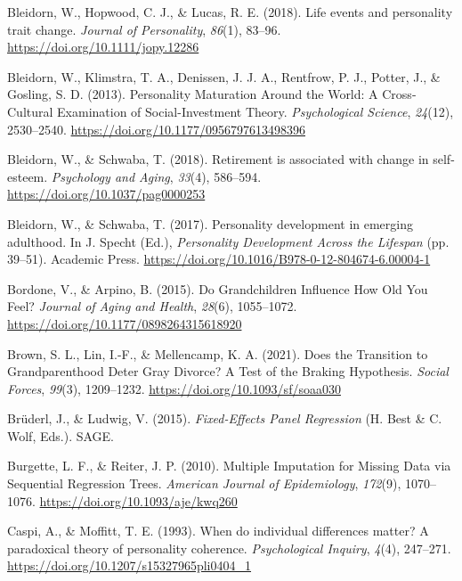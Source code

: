 \documentclass[
  english,
  man, noextraspace]{apa7}
\begin{document}
\leavevmode\hypertarget{ref-bleidornLifeEventsPersonality2018}{}%
Bleidorn, W., Hopwood, C. J., \& Lucas, R. E. (2018). Life events and personality trait change. \emph{Journal of Personality}, \emph{86}(1), 83--96. \url{https://doi.org/10.1111/jopy.12286}

\leavevmode\hypertarget{ref-bleidornPersonalityMaturationWorld2013}{}%
Bleidorn, W., Klimstra, T. A., Denissen, J. J. A., Rentfrow, P. J., Potter, J., \& Gosling, S. D. (2013). Personality Maturation Around the World: A Cross-Cultural Examination of Social-Investment Theory. \emph{Psychological Science}, \emph{24}(12), 2530--2540. \url{https://doi.org/10.1177/0956797613498396}

\leavevmode\hypertarget{ref-bleidornRetirementAssociatedChange2018}{}%
Bleidorn, W., \& Schwaba, T. (2018). Retirement is associated with change in self-esteem. \emph{Psychology and Aging}, \emph{33}(4), 586--594. \url{https://doi.org/10.1037/pag0000253}

\leavevmode\hypertarget{ref-bleidornPersonalityDevelopmentEmerging2017}{}%
Bleidorn, W., \& Schwaba, T. (2017). Personality development in emerging adulthood. In J. Specht (Ed.), \emph{Personality Development Across the Lifespan} (pp. 39--51). Academic Press. \url{https://doi.org/10.1016/B978-0-12-804674-6.00004-1}

\leavevmode\hypertarget{ref-bordoneGrandchildrenInfluenceHow2015}{}%
Bordone, V., \& Arpino, B. (2015). Do Grandchildren Influence How Old You Feel? \emph{Journal of Aging and Health}, \emph{28}(6), 1055--1072. \url{https://doi.org/10.1177/0898264315618920}

\leavevmode\hypertarget{ref-brownDoesTransitionGrandparenthood2021}{}%
Brown, S. L., Lin, I.-F., \& Mellencamp, K. A. (2021). Does the Transition to Grandparenthood Deter Gray Divorce? A Test of the Braking Hypothesis. \emph{Social Forces}, \emph{99}(3), 1209--1232. \url{https://doi.org/10.1093/sf/soaa030}

\leavevmode\hypertarget{ref-bruderlFixedEffectsPanelRegression2015}{}%
Brüderl, J., \& Ludwig, V. (2015). \emph{Fixed-Effects Panel Regression} (H. Best \& C. Wolf, Eds.). SAGE.

\leavevmode\hypertarget{ref-burgetteMultipleImputationMissing2010}{}%
Burgette, L. F., \& Reiter, J. P. (2010). Multiple Imputation for Missing Data via Sequential Regression Trees. \emph{American Journal of Epidemiology}, \emph{172}(9), 1070--1076. \url{https://doi.org/10.1093/aje/kwq260}

\leavevmode\hypertarget{ref-caspiWhenIndividualDifferences1993}{}%
Caspi, A., \& Moffitt, T. E. (1993). When do individual differences matter? A paradoxical theory of personality coherence. \emph{Psychological Inquiry}, \emph{4}(4), 247--271. \url{https://doi.org/10.1207/s15327965pli0404_1}
\end{document}
